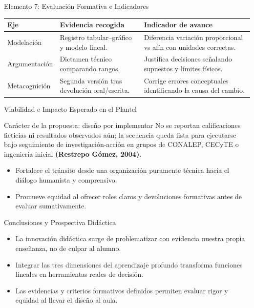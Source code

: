 \documentclass[aspectratio=169,spanish,xcolor=table]{beamer}
\begin{document}
\begin{frame}{Elemento 7: Evaluación Formativa e Indicadores}
  \scriptsize\renewcommand{\arraystretch}{1.38}
  \begin{tabular}{p{2.6cm}p{4.8cm}p{5.5cm}}
    \toprule
    \rowcolor{iiiepePale} \textbf{Eje} & \textbf{Evidencia recogida} & \textbf{Indicador de avance} \\
    \midrule
    Modelación & Registro tabular--gráfico y modelo lineal. & Diferencia variación proporcional vs afín con unidades correctas. \\
    Argumentación & Dictamen técnico comparando rangos. & Justifica decisiones señalando supuestos y límites físicos. \\
    Metacognición & Segunda versión tras devolución oral/escrita. & Corrige errores conceptuales identificando la causa del cambio. \\
    \bottomrule
  \end{tabular}
\end{frame}

\begin{frame}{Viabilidad e Impacto Esperado en el Plantel}
  \begin{block}{Carácter de la propuesta: diseño por implementar}
    \small No se reportan calificaciones ficticias ni resultados observados aún; la secuencia queda lista para ejecutarse bajo seguimiento de investigación-acción en grupos de CONALEP, CECyTE o ingeniería inicial \textbf{(Restrepo Gómez, 2004)}.
  \end{block}
  \vspace{0.3cm}
  \begin{itemize}\small
    \item Fortalece el tránsito desde una organización puramente técnica hacia el diálogo humanista y comprensivo.
    \item Promueve equidad al ofrecer roles claros y devoluciones formativas antes de evaluar sumativamente.
  \end{itemize}
\end{frame}

\begin{frame}{Conclusiones y Prospectiva Didáctica}
  \begin{itemize}\normalsize
    \item La innovación didáctica surge de problematizar con evidencia nuestra propia enseñanza, no de culpar al alumno.
    \item Integrar las tres dimensiones del aprendizaje profundo transforma funciones lineales en herramientas reales de decisión.
    \item Las evidencias y criterios formativos definidos permiten evaluar rigor y equidad al llevar el diseño al aula.
  \end{itemize}
\end{frame}
\end{document}
